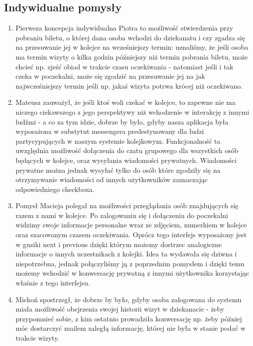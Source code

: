 \documentclass[12pt]{article}
\begin{document}
\subsection {Indywidualne pomysły}
\begin {enumerate}
	\item Pierwsza koncepcja indywidualna Piotra to możliwość stwierdzenia przy pobraniu biletu, o której dana osoba wchodzi do dziekanatu i czy zgadza się na przesuwanie jej w kolejce na wcześniejszy termin: uznaliśmy, że jeśli osoba ma termin wizyty o kilka godzin późniejszy niż termin pobrania biletu, może chcieć np. zjeść obiad w trakcie czasu oczekiwania - natomiast jeśli i tak czeka w poczekalni, może się zgodzić na przesuwanie jej na jak najwcześniejszy termin jeśli np. jakaś wizyta potrwa krócej niż oczekiwano.
	
	\item Mateusz zauważył, że jeśli ktoś woli czekać w kolejce, to zapewne nie ma niczego ciekawszego z jego perspektywy niż wchodzenie w interakcję z innymi ludźmi - a co za tym idzie, dobrze by było, gdyby nasza aplikacja była wyposażona w substytut messengera predestynowany dla ludzi partycypujących w naszym systemie kolejkowym. Funkcjonalność ta uwzględnia możliwość dołączenia do czatu grupowego dla wszystkich osób będących w kolejce, oraz wysyłania wiadomości prywatnych. Wiadomości prywatne można jednak wysyłać tylko do osób które zgodziły się na otrzymywanie wiadomości od innych użytkowników zaznaczając odpowiedniego checkboxa.
	
	\item Pomysł Macieja polegał na możliwości przeglądania osób znajdujących się razem z nami w kolejce. Po zalogowaniu się i dołączeniu do poczekalni widzimy swoje informacje personalne wraz ze zdjęciem, numerkiem w kolejce oraz szacowanym czasem oczekiwania. Oprócz tego interfejs wyposażony jest w guziki next i previous dzięki którym możemy dostrzec analogiczne informacje o innych uczestnikach z kolejki. Idea ta wydawała się dziwna i niepotrzebna, jednak połączyliśmy ją z poprzednim pomysłem i dzięki temu możemy wchodzić w konwersację prywatną z innymi użytkownika korzystając właśnie z tego interfejsu.	
	
	\item Michoń spostrzegł, że dobrze by było, gdyby osoba zalogowana do systemu miała możliwość obejrzenia swojej historii wizyt w dziekanacie - żeby przypomnieć sobie, z kim ostatnio prowadziła konwersację np. żeby później móc dostarczyć mailem zaległą informację, której nie była w stanie podać w trakcie wizyty.

\end {enumerate}
\end{document}
